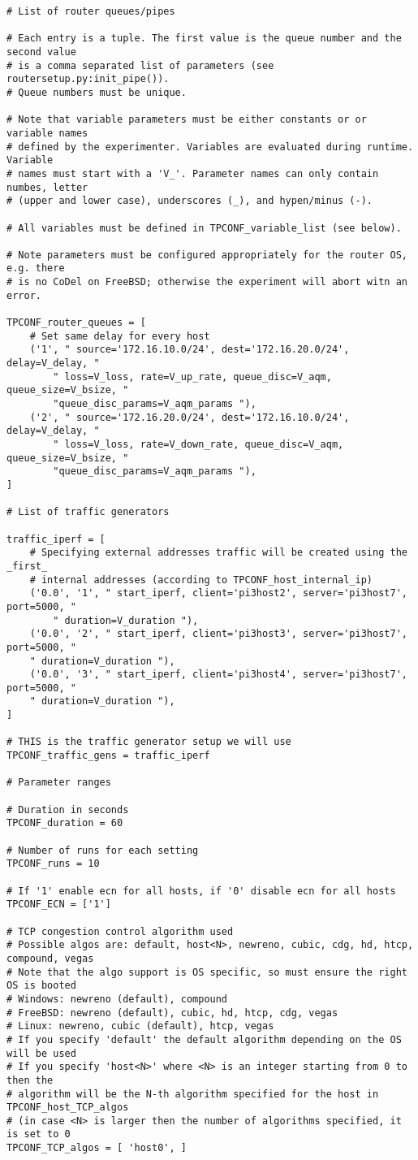 \begin{code}
\begin{verbatim}
# List of router queues/pipes

# Each entry is a tuple. The first value is the queue number and the second value
# is a comma separated list of parameters (see routersetup.py:init_pipe()).
# Queue numbers must be unique.

# Note that variable parameters must be either constants or or variable names
# defined by the experimenter. Variables are evaluated during runtime. Variable
# names must start with a 'V_'. Parameter names can only contain numbes, letter
# (upper and lower case), underscores (_), and hypen/minus (-).

# All variables must be defined in TPCONF_variable_list (see below).

# Note parameters must be configured appropriately for the router OS, e.g. there
# is no CoDel on FreeBSD; otherwise the experiment will abort witn an error.

TPCONF_router_queues = [
    # Set same delay for every host
    ('1', " source='172.16.10.0/24', dest='172.16.20.0/24', delay=V_delay, "
        " loss=V_loss, rate=V_up_rate, queue_disc=V_aqm, queue_size=V_bsize, "
        "queue_disc_params=V_aqm_params "),
    ('2', " source='172.16.20.0/24', dest='172.16.10.0/24', delay=V_delay, "
        " loss=V_loss, rate=V_down_rate, queue_disc=V_aqm, queue_size=V_bsize, "
        "queue_disc_params=V_aqm_params "),
]

# List of traffic generators

traffic_iperf = [
    # Specifying external addresses traffic will be created using the _first_
    # internal addresses (according to TPCONF_host_internal_ip)
    ('0.0', '1', " start_iperf, client='pi3host2', server='pi3host7', port=5000, "
        " duration=V_duration "),
    ('0.0', '2', " start_iperf, client='pi3host3', server='pi3host7', port=5000, "
    " duration=V_duration "),
    ('0.0', '3', " start_iperf, client='pi3host4', server='pi3host7', port=5000, "
    " duration=V_duration "),
]

# THIS is the traffic generator setup we will use
TPCONF_traffic_gens = traffic_iperf

# Parameter ranges

# Duration in seconds
TPCONF_duration = 60

# Number of runs for each setting
TPCONF_runs = 10

# If '1' enable ecn for all hosts, if '0' disable ecn for all hosts
TPCONF_ECN = ['1']

# TCP congestion control algorithm used
# Possible algos are: default, host<N>, newreno, cubic, cdg, hd, htcp, compound, vegas
# Note that the algo support is OS specific, so must ensure the right OS is booted
# Windows: newreno (default), compound
# FreeBSD: newreno (default), cubic, hd, htcp, cdg, vegas
# Linux: newreno, cubic (default), htcp, vegas
# If you specify 'default' the default algorithm depending on the OS will be used
# If you specify 'host<N>' where <N> is an integer starting from 0 to then the
# algorithm will be the N-th algorithm specified for the host in TPCONF_host_TCP_algos 
# (in case <N> is larger then the number of algorithms specified, it is set to 0
TPCONF_TCP_algos = [ 'host0', ]


\end{verbatim}
\end{code}
